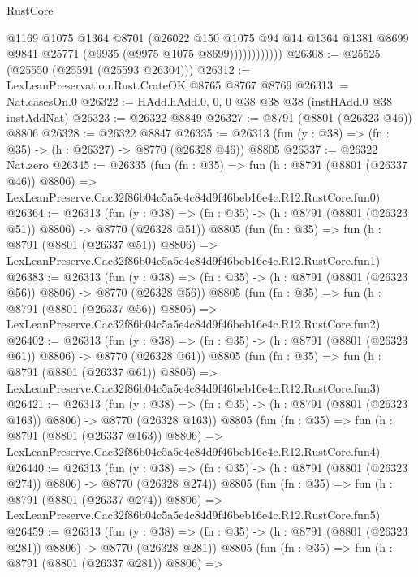 \begin{lexlean}{RustCore}
\begin{coremodule}
                      @1169
                      @1075
                      @1364
                      @8701
                      (@26022
                        @150
                        @1075
                        @94
                        @14
                        @1364
                        @1381
                        @8699
                        @9841
                        @25771
                        (@9935 (@9975 @1075 @8699))))))))))))
@26308 := @25525 (@25550 (@25591 (@25593 @26304)))
@26312 := LexLeanPreservation.Rust.CrateOK @8765 @8767 @8769
@26313 := Nat.casesOn.{0}
@26322 := HAdd.hAdd.{0, 0, 0} @38 @38 @38 (instHAdd.{0} @38 instAddNat)
@26323 := @26322 @8849
@26327 := @8791 (@8801 (@26323 @46)) @8806
@26328 := @26322 @8847
@26335 := @26313 (fun (y : @38) => (fn : @35) -> (h : @26327) -> @8770 (@26328 @46)) @8805
@26337 := @26322 Nat.zero
@26345 := @26335
    (fun (fn : @35) =>
    fun (h : @8791 (@8801 (@26337 @46)) @8806) =>
    LexLeanPreserve.Cac32f86b04c5a5e4c84d9f46beb16e4c.R12.RustCore.fun0)
@26364 := @26313
    (fun (y : @38) => (fn : @35) -> (h : @8791 (@8801 (@26323 @51)) @8806) -> @8770 (@26328 @51))
    @8805
    (fun (fn : @35) =>
    fun (h : @8791 (@8801 (@26337 @51)) @8806) =>
    LexLeanPreserve.Cac32f86b04c5a5e4c84d9f46beb16e4c.R12.RustCore.fun1)
@26383 := @26313
    (fun (y : @38) => (fn : @35) -> (h : @8791 (@8801 (@26323 @56)) @8806) -> @8770 (@26328 @56))
    @8805
    (fun (fn : @35) =>
    fun (h : @8791 (@8801 (@26337 @56)) @8806) =>
    LexLeanPreserve.Cac32f86b04c5a5e4c84d9f46beb16e4c.R12.RustCore.fun2)
@26402 := @26313
    (fun (y : @38) => (fn : @35) -> (h : @8791 (@8801 (@26323 @61)) @8806) -> @8770 (@26328 @61))
    @8805
    (fun (fn : @35) =>
    fun (h : @8791 (@8801 (@26337 @61)) @8806) =>
    LexLeanPreserve.Cac32f86b04c5a5e4c84d9f46beb16e4c.R12.RustCore.fun3)
@26421 := @26313
    (fun (y : @38) => (fn : @35) -> (h : @8791 (@8801 (@26323 @163)) @8806) -> @8770 (@26328 @163))
    @8805
    (fun (fn : @35) =>
    fun (h : @8791 (@8801 (@26337 @163)) @8806) =>
    LexLeanPreserve.Cac32f86b04c5a5e4c84d9f46beb16e4c.R12.RustCore.fun4)
@26440 := @26313
    (fun (y : @38) => (fn : @35) -> (h : @8791 (@8801 (@26323 @274)) @8806) -> @8770 (@26328 @274))
    @8805
    (fun (fn : @35) =>
    fun (h : @8791 (@8801 (@26337 @274)) @8806) =>
    LexLeanPreserve.Cac32f86b04c5a5e4c84d9f46beb16e4c.R12.RustCore.fun5)
@26459 := @26313
    (fun (y : @38) => (fn : @35) -> (h : @8791 (@8801 (@26323 @281)) @8806) -> @8770 (@26328 @281))
    @8805
    (fun (fn : @35) =>
    fun (h : @8791 (@8801 (@26337 @281)) @8806) =>

\end{coremodule}
\end{lexlean}
